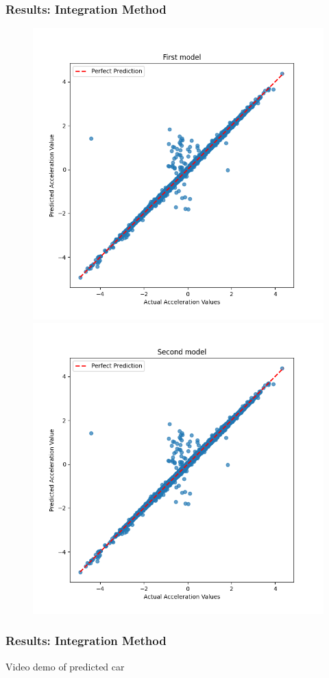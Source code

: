 \begin{frame}
  \frametitle{Results: Integration Method}
  \begin{figure}
    \centering
    \begin{minipage}[b]{0.45\linewidth}
      \centering
      \includegraphics[width=\textwidth]{figures/graphs/First model.png}
    \end{minipage}
    \begin{minipage}[b]{0.45\linewidth}
      \centering
      \includegraphics[width=\textwidth]{figures/graphs/Second model.png}
    \end{minipage}
  \end{figure}
\end{frame}

\begin{frame}
  \frametitle{Results: Integration Method}
    \center Video demo of predicted car
\end{frame}

